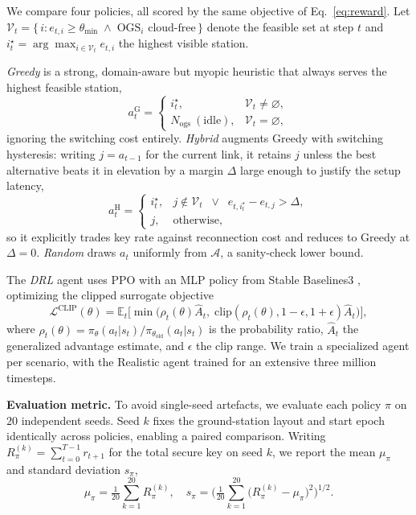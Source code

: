 \documentclass[manuscript, review, nonacm]{acmart}
\newcommand{\Nseed}{20}
\begin{document}
We compare four policies, all scored by the same objective of Eq.~\eqref{eq:reward}. Let $\mathcal{V}_t = \{\, i : e_{t,i} \ge \theta_{\min} \;\wedge\; \text{$\text{OGS}_i$ cloud-free}\,\}$ denote the feasible set at step $t$ and $i_t^\star = \arg\max_{i\in\mathcal{V}_t} e_{t,i}$ the highest visible station.

\textit{Greedy} is a strong, domain-aware but myopic heuristic that always serves the highest feasible station,
\begin{equation}
a_t^{\mathrm{G}} = \begin{cases} i_t^\star, & \mathcal{V}_t \neq \varnothing,\\ N_{\text{ogs}}\ (\text{idle}), & \mathcal{V}_t = \varnothing,\end{cases}
\label{eq:greedy}
\end{equation}
ignoring the switching cost entirely. \textit{Hybrid} augments Greedy with switching hysteresis: writing $j=a_{t-1}$ for the current link, it retains $j$ unless the best alternative beats it in elevation by a margin $\Delta$ large enough to justify the setup latency,
\begin{equation}
a_t^{\mathrm{H}} = \begin{cases} i_t^\star, & j \notin \mathcal{V}_t \;\;\vee\;\; e_{t,i_t^\star} - e_{t,j} > \Delta,\\ j, & \text{otherwise},\end{cases}
\label{eq:hybrid}
\end{equation}
so it explicitly trades key rate against reconnection cost and reduces to Greedy at $\Delta=0$. \textit{Random} draws $a_t$ uniformly from $\mathcal{A}$, a sanity-check lower bound.

The \textit{DRL} agent uses PPO \cite{schulman2017proximal} with an MLP policy from Stable Baselines3 \cite{stable-baselines3}, optimizing the clipped surrogate objective
\begin{equation}
\mathcal{L}^{\mathrm{CLIP}}(\theta) = \mathbb{E}_t\!\Big[\min\big(\rho_t(\theta)\hat{A}_t,\; \mathrm{clip}(\rho_t(\theta),1-\epsilon,1+\epsilon)\hat{A}_t\big)\Big],
\label{eq:ppo}
\end{equation}
where $\rho_t(\theta)=\pi_\theta(a_t|s_t)/\pi_{\theta_{\text{old}}}(a_t|s_t)$ is the probability ratio, $\hat{A}_t$ the generalized advantage estimate, and $\epsilon$ the clip range. We train a specialized agent per scenario, with the Realistic agent trained for an extensive three million timesteps.

\textbf{Evaluation metric.} To avoid single-seed artefacts, we evaluate each policy $\pi$ on $\Nseed$ independent seeds. Seed $k$ fixes the ground-station layout and start epoch identically across policies, enabling a paired comparison. Writing $R^{(k)}_\pi = \sum_{t=0}^{T-1} r_{t+1}$ for the total secure key on seed $k$, we report the mean $\mu_\pi$ and standard deviation $s_\pi$,
\begin{equation}
\mu_\pi = \tfrac{1}{\Nseed}\textstyle\sum_{k=1}^{\Nseed} R^{(k)}_\pi, \quad
s_\pi = \Big(\tfrac{1}{\Nseed}\textstyle\sum_{k=1}^{\Nseed}\big(R^{(k)}_\pi-\mu_\pi\big)^2\Big)^{1/2}.
\label{eq:metric}
\end{equation}
\end{document}
